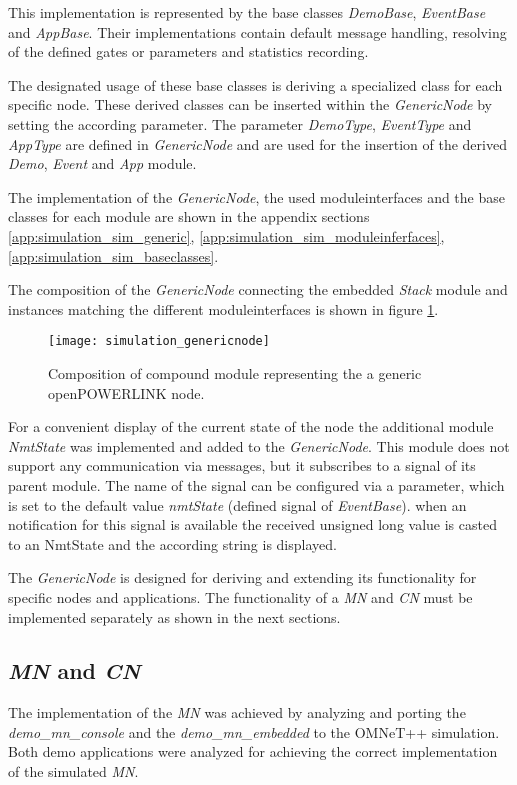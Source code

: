 This implementation is represented by the base classes \emph{DemoBase}, \emph{EventBase} and \emph{AppBase}.
Their implementations contain default message handling, resolving of the defined gates or parameters and statistics recording.

The designated usage of these base classes is deriving a specialized class for each specific node.
These derived classes can be inserted within the \emph{GenericNode} by setting the according parameter.
The parameter \emph{DemoType}, \emph{EventType} and \emph{AppType} are defined in \emph{GenericNode} and are used for the insertion of the derived \emph{Demo}, \emph{Event} and \emph{App} module.

The implementation of the \emph{GenericNode}, the used moduleinterfaces and the base classes for each module are shown in the appendix sections \ref{app:simulation_sim_generic}, \ref{app:simulation_sim_moduleinferfaces}, \ref{app:simulation_sim_baseclasses}.

The composition of the \emph{GenericNode} connecting the embedded \emph{Stack} module and instances matching the different moduleinterfaces is shown in figure \ref{fig:simulation_genericnode}.

\begin{figure}
    \centering
    \texttt{[image: simulation\_genericnode]}
    \caption{Composition of compound module representing the a generic openPOWERLINK node.}
    \label{fig:simulation_genericnode}
\end{figure}

For a convenient display of the current state of the node the additional module \emph{NmtState} was implemented and added to the \emph{GenericNode}.
This module does not support any communication via messages, but it subscribes to a signal of its parent module.
The name of the signal can be configured via a parameter, which is set to the default value \emph{nmtState} (defined signal of \emph{EventBase}).
when an notification for this signal is available the received unsigned long value is casted to an NmtState and the according string is displayed.

The \emph{GenericNode} is designed for deriving and extending its functionality for specific nodes and applications.
The functionality of a \emph{MN} and \emph{CN} must be implemented separately as shown in the next sections.

\subsection{\emph{MN} and \emph{CN}}
\label{sec:porting_nodes_mn_cm}
The implementation of the \emph{MN} was achieved by analyzing and porting the \emph{demo\_mn\_console} and the \emph{demo\_mn\_embedded} to the OMNeT++ simulation.
Both demo applications were analyzed for achieving the correct implementation of the simulated \emph{MN}.


